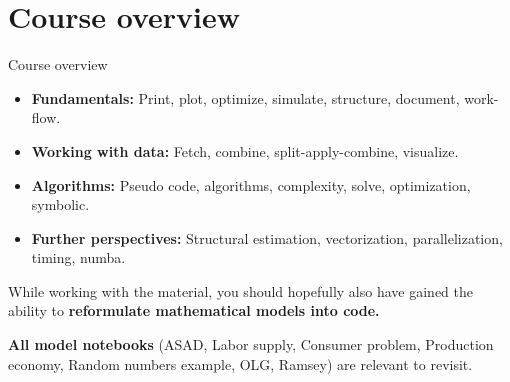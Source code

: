 \documentclass[10pt,english,t,aspectratio=169]{beamer}
\begin{document}
\section{Course overview}
\begin{frame}{Course overview}
\begin{itemize}
    \item \textbf{Fundamentals:} Print, plot, optimize, simulate, structure, document, work-flow.  \par 
    \item \textbf{Working with data:} Fetch, combine, split-apply-combine, visualize.
    \item \textbf{Algorithms:} Pseudo code, algorithms, complexity, solve, optimization, symbolic.
    \item \textbf{Further perspectives:} Structural estimation, vectorization, parallelization, timing, numba.
\end{itemize}
    \vfill 
    While working with the material, you should hopefully also have gained the ability to \textbf{reformulate mathematical models into code.} \par 
    \textbf{All model notebooks} (ASAD, Labor supply, Consumer problem, Production economy,  Random numbers example, OLG, Ramsey) are relevant to revisit.
\end{frame}
\end{document}
